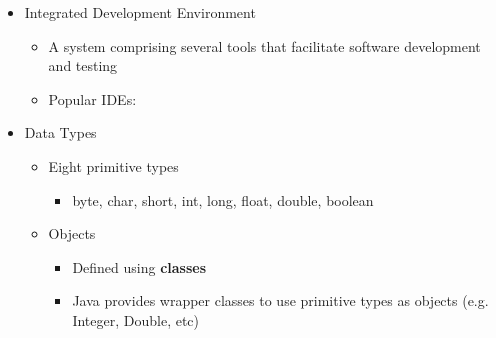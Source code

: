 \documentclass[11pt]{article}
\begin{document}
\begin{itemize}
	\item Integrated Development Environment
		\begin{itemize}
			\item A system comprising several tools that facilitate software development and testing
			\item Popular IDEs:
		\end{itemize}

	\item Data Types
		\begin{itemize}
			\item Eight primitive types
				\begin{itemize}
					\item byte, char, short, int, long, float, double, boolean
				\end{itemize}
			\item Objects
				\begin{itemize}
					\item Defined using \textbf{classes}
					\item Java provides wrapper classes to use primitive types as objects (e.g. Integer, Double, etc)
				\end{itemize}
		\end{itemize}


\end{itemize}
\end{document}
